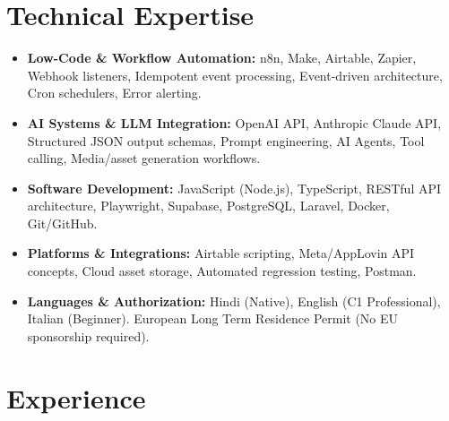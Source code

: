 \documentclass[10pt,a4paper]{article}
\begin{document}
\section{Technical Expertise}
\begin{itemize}
  \item \textbf{Low-Code \& Workflow Automation:} n8n, Make, Airtable, Zapier, Webhook listeners, Idempotent event processing, Event-driven architecture, Cron schedulers, Error alerting.
  \item \textbf{AI Systems \& LLM Integration:} OpenAI API, Anthropic Claude API, Structured JSON output schemas, Prompt engineering, AI Agents, Tool calling, Media/asset generation workflows.
  \item \textbf{Software Development:} JavaScript (Node.js), TypeScript, RESTful API architecture, Playwright, Supabase, PostgreSQL, Laravel, Docker, Git/GitHub.
  \item \textbf{Platforms \& Integrations:} Airtable scripting, Meta/AppLovin API concepts, Cloud asset storage, Automated regression testing, Postman.
  \item \textbf{Languages \& Authorization:} Hindi (Native), English (C1 Professional), Italian (Beginner). European Long Term Residence Permit (No EU sponsorship required).
\end{itemize}

\section{Experience}
\end{document}
